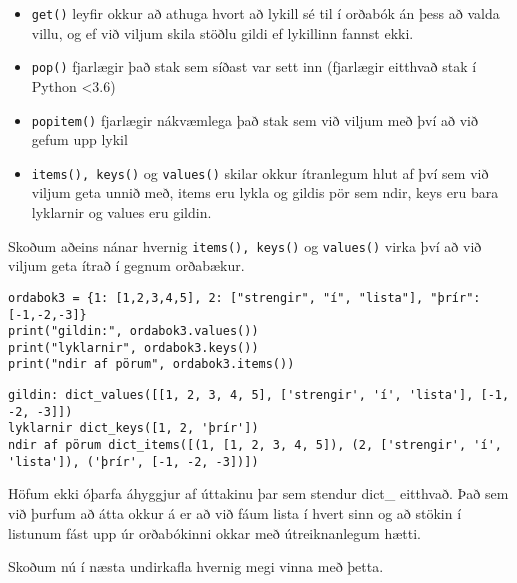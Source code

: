 \begin{itemize}
\item[] \texttt{get()} leyfir okkur að athuga hvort að lykill sé til í orðabók án þess að valda villu, og ef við viljum skila stöðlu gildi ef lykillinn fannst ekki.
\item[] \texttt{pop()} fjarlægir það stak sem síðast var sett inn (fjarlægir eitthvað stak í Python <3.6)
\item[] \texttt{popitem()} fjarlægir nákvæmlega það stak sem við viljum með því að við gefum upp lykil
\item[] \texttt{items(), keys()} og \texttt{values()} skilar okkur ítranlegum hlut af því sem við viljum geta unnið með, items eru lykla og gildis pör sem ndir, keys eru bara lyklarnir og values eru gildin.
\end{itemize}

Skoðum aðeins nánar hvernig \texttt{items(), keys()} og \texttt{values()} virka því að við viljum geta ítrað í gegnum orðabækur.

\begin{lstlisting}[caption=Aðferðir á orðabækur, label=lst:dict-kynnt3]
ordabok3 = {1: [1,2,3,4,5], 2: ["strengir", "í", "lista"], "þrír": [-1,-2,-3]}
print("gildin:", ordabok3.values())
print("lyklarnir", ordabok3.keys())
print("ndir af pörum", ordabok3.items())
\end{lstlisting}
\lstset{style=uttak}
\begin{lstlisting}
gildin: dict_values([[1, 2, 3, 4, 5], ['strengir', 'í', 'lista'], [-1, -2, -3]])
lyklarnir dict_keys([1, 2, 'þrír'])
ndir af pörum dict_items([(1, [1, 2, 3, 4, 5]), (2, ['strengir', 'í', 'lista']), ('þrír', [-1, -2, -3])])
\end{lstlisting}
\lstset{style=venjulegt}

Höfum ekki óþarfa áhyggjur af úttakinu þar sem stendur dict\_ eitthvað.
Það sem við þurfum að átta okkur á er að við fáum lista í hvert sinn og að stökin í listunum fást upp úr orðabókinni okkar með útreiknanlegum hætti.

Skoðum nú í næsta undirkafla hvernig megi vinna með þetta.

